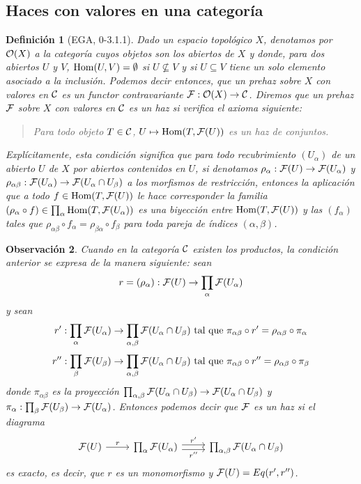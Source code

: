 \documentclass[twoside]{article}
\newtheorem{defin}{Definición}[section]
\newtheorem{obs}[defin]{Observación}
\begin{document}
\subsection{Haces con valores en una categoría}

\begin{defin}[EGA, 0-3.1.1]\label{axioma}
Dado un espacio topológico $X$, denotamos por ${\mathcal O}(X)$ a la categoría cuyos objetos son los abiertos de $X$ y donde, para dos abiertos $U$ y $V$, $\operatorname{Hom}(U,V)=\emptyset$ si $U\not\subseteq V$ y si $U\subseteq V$ tiene un solo elemento asociado a la inclusión. Podemos decir entonces, que un \emph{prehaz sobre $X$ con valores en ${\mathcal C}$} es un functor contravariante $\mathcal{F}:{\mathcal O}(X)\to{\mathcal C}$. Diremos que un prehaz $\mathcal{F}$ sobre $X$ con valores en ${\mathcal C}$ es un \emph{haz} si verifica el axioma siguiente:

\begin{verse}
Para todo objeto $T\in{\mathcal C}$, $U\mapsto\operatorname{Hom}(T,\mathcal{F}(U))$ es un haz de conjuntos. %
\end{verse}

Explícitamente, esta condición significa que para todo recubrimiento $(U_\alpha)$ de un abierto $U$ de $X$ por abiertos contenidos en $U$, si denotamos $\rho_\alpha:\mathcal{F}(U)\to\mathcal{F}(U_\alpha)$ y $\rho_{\alpha\beta}:\mathcal{F}(U_\alpha)\to\mathcal{F}(U_\alpha\cap U_\beta)$ a los morfismos de restricción, entonces la aplicación que a todo $f\in\operatorname{Hom}(T,\mathcal{F}(U))$ le hace corresponder la familia $(\rho_\alpha\circ f)\in \prod_\alpha\operatorname{Hom}(T,\mathcal{F}(U_\alpha))$ es una biyección entre $\operatorname{Hom}(T,\mathcal{F}(U))$ y las $(f_\alpha)$ tales que $\rho_{\alpha\beta}\circ f_\alpha=\rho_{\beta\alpha}\circ f_\beta$ para toda pareja de índices $(\alpha,\beta)$. %
\end{defin}

\begin{obs}\label{ecualizador}
Cuando en la categoría ${\mathcal C}$ existen los productos, la condición anterior se expresa de la manera siguiente: sean
\[
r=(\rho_\alpha):\mathcal{F}(U)\to\prod_\alpha\mathcal{F}(U_\alpha)
\]
y sean
\[
r':\prod_\alpha\mathcal{F}(U_\alpha)\to\prod_{\alpha,\beta}\mathcal{F}(U_\alpha\cap U_\beta)\text{ tal que }\pi_{\alpha\beta}\circ r'=\rho_{\alpha\beta}\circ \pi_{\alpha}
\]
\[
r'':\prod_\beta\mathcal{F}(U_\beta)\to\prod_{\alpha,\beta}\mathcal{F}(U_\alpha\cap U_\beta)\text{ tal que }\pi_{\alpha\beta}\circ r''=\rho_{\alpha\beta}\circ \pi_{\beta}
\]
donde $\pi_{\alpha\beta}$ es la proyección $\prod_{\alpha,\beta}\mathcal{F}(U_\alpha\cap U_\beta)\to \mathcal{F}(U_\alpha\cap U_\beta)$ y $\pi_\alpha:\prod_\beta\mathcal{F}(U_\beta)\to\mathcal{F}(U_\alpha)$. Entonces podemos decir que $\mathcal{F}$ es un haz si el diagrama
\[
\begin{tikzcd}
\calF(U)\arrow[r, "r"]&\prod_\alpha\calF(U_\alpha)\arrow[r, shift left, "r'"]\arrow[r, shift right, "r''"'] &\prod_{\alpha,\beta}\calF(U_\alpha\cap U_\beta)
\end{tikzcd}
\]
es exacto, es decir, que $r$ es un monomorfismo y $\mathcal{F}(U)=Eq(r',r'')$. %
\end{obs}
\end{document}
